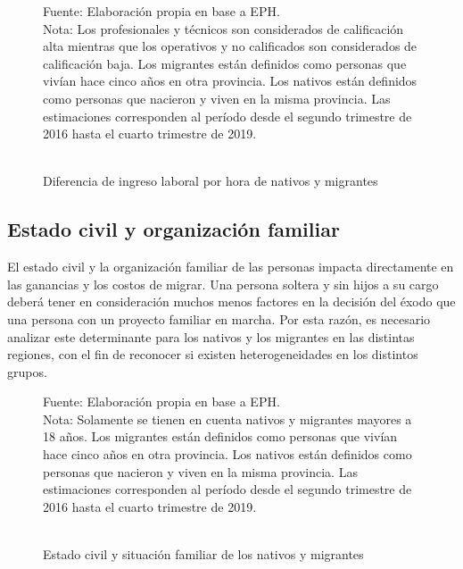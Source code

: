 \documentclass[12pt,a4paper]{article}
\begin{document}
\begin{figure}[!htbp]
\begin{center}
\caption{\\Diferencia de ingreso laboral por hora de nativos y migrantes}
\label{figure:prima_sal}
 

  
\end{center}
\begin{flushleft}
\begin{scriptsize}
Fuente: Elaboración propia en base a EPH.\\
Nota: Los profesionales y técnicos son considerados de calificación alta mientras que los operativos y no calificados son considerados de calificación baja. Los migrantes están definidos como personas que vivían hace cinco años en otra provincia. Los nativos están definidos como personas que nacieron y viven en la misma provincia. Las estimaciones corresponden al período desde el segundo trimestre de 2016 hasta el cuarto trimestre de 2019.\\
\end{scriptsize}
\end{flushleft}
\end{figure}

\newpage
\subsection{Estado civil y organización familiar}

El estado civil y la organización familiar de las personas impacta directamente en las ganancias y los costos de migrar. Una persona soltera y sin hijos a su cargo deberá tener en consideración muchos menos factores en la decisión del éxodo que una persona con un proyecto familiar en marcha. Por esta razón, es necesario analizar este determinante para los nativos y los migrantes en las distintas regiones, con el fin de reconocer si existen heterogeneidades en los distintos grupos.

\begin{figure}[htbp!]
\begin{center}
\caption{\\Estado civil y situación familiar de los nativos y migrantes}
\label{figure:estadociv_mig}
 
\end{center}
\begin{flushleft}
\begin{scriptsize}
Fuente: Elaboración propia en base a EPH.\\
Nota: Solamente se tienen en cuenta nativos y migrantes mayores a 18 años. Los migrantes están definidos como personas que vivían hace cinco años en otra provincia. Los nativos están definidos como personas que nacieron y viven en la misma provincia. Las estimaciones corresponden al período desde el segundo trimestre de 2016 hasta el cuarto trimestre de 2019.\\
\end{scriptsize}
\end{flushleft}
\end{figure}
\end{document}
